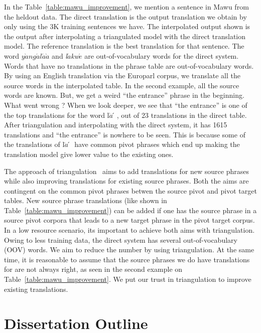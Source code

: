 In the Table~\ref{table:mawu_improvement}, we mention a sentence in Mawu from the heldout data. The direct translation is the output translation we obtain by only using the 3K training sentences we have. The interpolated output shown is the output after interpolating a triangulated model with the direct translation model. The reference translation is the best translation for that sentence. The word \emph{$y\grave{a}ng\acute{a}l\acute{a}\grave{a}$} and \emph{l$\acute{a}$kw$\acute{e}$} are out-of-vocabulary words for the direct system. Words that have no translations in the phrase table are out-of-vocabulary words. By using an English translation via the Europarl corpus, we translate all the source words in the interpolated table. In the second example, all the source words are known. But, we get a weird ``the entrance'' phrase in the beginning. What went wrong ? When we look deeper, we see that ``the entrance'' is one of the top translations for the word l$\grave{a}́$, out of 23 translations in the direct table. After triangulation and interpolating with the direct system, it has 1615 translations and ``the entrance'' is nowhere to be seen. This is because some of the translations of l$\grave{a}́$ have common pivot phrases which end up making the translation model give lower value to the existing ones. 


The approach of triangulation~\cite{Cohn:07,Utiyama:07} aims to add translations for new source phrases while also improving translations for existing source phrases. Both the aims are contingent on the common pivot phrases betwen the source pivot and pivot target tables. New source phrase translations (like shown in Table~\ref{table:mawu_improvement}) can be added if one has the source phrase in a source pivot corpora that leads to a new target phrase in the pivot target corpus. In a low resource scenario, its important to achieve both aims with triangulation. Owing to less training data, the direct system has several out-of-vocabulary (OOV) words. We aim to reduce the number by using triangulation. At the same time, it is reasonable to assume that the source phrases we do have translations for are not always right, as seen in the second example on Table~\ref{table:mawu_improvement}. We put our trust in triangulation to improve existing translations. 

\section{Dissertation Outline}
\label{sec:outline}

